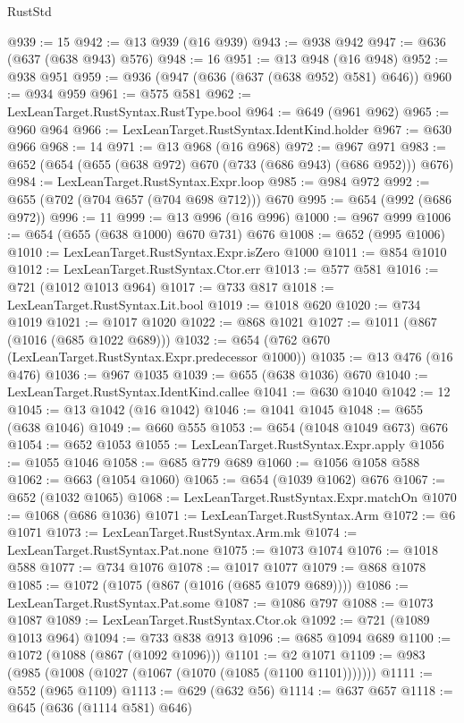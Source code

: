 \begin{lexlean}{RustStd}
\begin{coremodule}
{\begin{coremodule}
{{{{{{{{{{{{{{{@939 := 15
@942 := @13 @939 (@16 @939)
@943 := @938 @942
@947 := @636 (@637 (@638 @943) @576)
@948 := 16
@951 := @13 @948 (@16 @948)
@952 := @938 @951
@959 := @936 (@947 (@636 (@637 (@638 @952) @581) @646))
@960 := @934 @959
@961 := @575 @581
@962 := LexLeanTarget.RustSyntax.RustType.bool
@964 := @649 (@961 @962)
@965 := @960 @964
@966 := LexLeanTarget.RustSyntax.IdentKind.holder
@967 := @630 @966
@968 := 14
@971 := @13 @968 (@16 @968)
@972 := @967 @971
@983 := @652 (@654 (@655 (@638 @972) @670 (@733 (@686 @943) (@686 @952))) @676)
@984 := LexLeanTarget.RustSyntax.Expr.loop
@985 := @984 @972
@992 := @655 (@702 (@704 @657 (@704 @698 @712))) @670
@995 := @654 (@992 (@686 @972))
@996 := 11
@999 := @13 @996 (@16 @996)
@1000 := @967 @999
@1006 := @654 (@655 (@638 @1000) @670 @731) @676
@1008 := @652 (@995 @1006)
@1010 := LexLeanTarget.RustSyntax.Expr.isZero @1000
@1011 := @854 @1010
@1012 := LexLeanTarget.RustSyntax.Ctor.err
@1013 := @577 @581
@1016 := @721 (@1012 @1013 @964)
@1017 := @733 @817
@1018 := LexLeanTarget.RustSyntax.Lit.bool
@1019 := @1018 @620
@1020 := @734 @1019
@1021 := @1017 @1020
@1022 := @868 @1021
@1027 := @1011 (@867 (@1016 (@685 @1022 @689)))
@1032 := @654 (@762 @670 (LexLeanTarget.RustSyntax.Expr.predecessor @1000))
@1035 := @13 @476 (@16 @476)
@1036 := @967 @1035
@1039 := @655 (@638 @1036) @670
@1040 := LexLeanTarget.RustSyntax.IdentKind.callee
@1041 := @630 @1040
@1042 := 12
@1045 := @13 @1042 (@16 @1042)
@1046 := @1041 @1045
@1048 := @655 (@638 @1046)
@1049 := @660 @555
@1053 := @654 (@1048 @1049 @673) @676
@1054 := @652 @1053
@1055 := LexLeanTarget.RustSyntax.Expr.apply
@1056 := @1055 @1046
@1058 := @685 @779 @689
@1060 := @1056 @1058 @588
@1062 := @663 (@1054 @1060)
@1065 := @654 (@1039 @1062) @676
@1067 := @652 (@1032 @1065)
@1068 := LexLeanTarget.RustSyntax.Expr.matchOn
@1070 := @1068 (@686 @1036)
@1071 := LexLeanTarget.RustSyntax.Arm
@1072 := @6 @1071
@1073 := LexLeanTarget.RustSyntax.Arm.mk
@1074 := LexLeanTarget.RustSyntax.Pat.none
@1075 := @1073 @1074
@1076 := @1018 @588
@1077 := @734 @1076
@1078 := @1017 @1077
@1079 := @868 @1078
@1085 := @1072 (@1075 (@867 (@1016 (@685 @1079 @689))))
@1086 := LexLeanTarget.RustSyntax.Pat.some
@1087 := @1086 @797
@1088 := @1073 @1087
@1089 := LexLeanTarget.RustSyntax.Ctor.ok
@1092 := @721 (@1089 @1013 @964)
@1094 := @733 @838 @913
@1096 := @685 @1094 @689
@1100 := @1072 (@1088 (@867 (@1092 @1096)))
@1101 := @2 @1071
@1109 := @983 (@985 (@1008 (@1027 (@1067 (@1070 (@1085 (@1100 @1101)))))))
@1111 := @552 (@965 @1109)
@1113 := @629 (@632 @56)
@1114 := @637 @657
@1118 := @645 (@636 (@1114 @581) @646)
}}}}}}}}}}}}}}}
\end{coremodule}}
\end{coremodule}
\end{lexlean}
